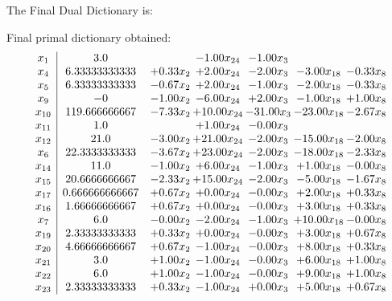 \documentclass[8pt]{article}
\begin{document}
The Final Dual Dictionary is: 

 Final primal dictionary obtained: 
\[\begin{array}{c| c c@{\hskip 2pt} c@{\hskip 2pt} c@{\hskip 2pt} c@{\hskip 2pt} c@{\hskip 2pt} }
 x_{1}   &  3.0  &   & -1.00 x_{24} & -1.00 x_{3} &    &   \\
 x_{4}   &  6.33333333333 & +  0.33 x_{2} & +  2.00 x_{24} & -2.00 x_{3} & -3.00 x_{18} & -0.33 x_{8}\\
 x_{5}   &  6.33333333333 & -0.67 x_{2} & +  2.00 x_{24} & -1.00 x_{3} & -2.00 x_{18} & -0.33 x_{8}\\
 x_{9}   &  -0 & -1.00 x_{2} & -6.00 x_{24} & +  2.00 x_{3} & -1.00 x_{18} & +  1.00 x_{8}\\
 x_{10}   &  119.666666667 & -7.33 x_{2} & + 10.00 x_{24} & -31.00 x_{3} & -23.00 x_{18} & -2.67 x_{8}\\
 x_{11}   &  1.0  &   & +  1.00 x_{24} & -0.00 x_{3} &    &   \\
 x_{12}   &  21.0 & -3.00 x_{2} & + 21.00 x_{24} & -2.00 x_{3} & -15.00 x_{18} & -2.00 x_{8}\\
 x_{6}   &  22.3333333333 & -3.67 x_{2} & + 23.00 x_{24} & -2.00 x_{3} & -18.00 x_{18} & -2.33 x_{8}\\
 x_{14}   &  11.0 & -1.00 x_{2} & +  6.00 x_{24} & -1.00 x_{3} & +  1.00 x_{18} & -0.00 x_{8}\\
 x_{15}   &  20.6666666667 & -2.33 x_{2} & + 15.00 x_{24} & -2.00 x_{3} & -5.00 x_{18} & -1.67 x_{8}\\
 x_{17}   &  0.666666666667 & +  0.67 x_{2} & +  0.00 x_{24} & -0.00 x_{3} & +  2.00 x_{18} & +  0.33 x_{8}\\
 x_{16}   &  1.66666666667 & +  0.67 x_{2} & +  0.00 x_{24} & -0.00 x_{3} & +  3.00 x_{18} & +  0.33 x_{8}\\
 x_{7}   &  6.0 & -0.00 x_{2} & -2.00 x_{24} & -1.00 x_{3} & + 10.00 x_{18} & -0.00 x_{8}\\
 x_{19}   &  2.33333333333 & +  0.33 x_{2} & +  0.00 x_{24} & -0.00 x_{3} & +  3.00 x_{18} & +  0.67 x_{8}\\
 x_{20}   &  4.66666666667 & +  0.67 x_{2} & -1.00 x_{24} & -0.00 x_{3} & +  8.00 x_{18} & +  0.33 x_{8}\\
 x_{21}   &  3.0 & +  1.00 x_{2} & -1.00 x_{24} & -0.00 x_{3} & +  6.00 x_{18} & +  1.00 x_{8}\\
 x_{22}   &  6.0 & +  1.00 x_{2} & -1.00 x_{24} & -0.00 x_{3} & +  9.00 x_{18} & +  1.00 x_{8}\\
 x_{23}   &  2.33333333333 & +  0.33 x_{2} & -1.00 x_{24} & +  0.00 x_{3} & +  5.00 x_{18} & +  0.67 x_{8}\\

\end{array}\]
\end{document}

